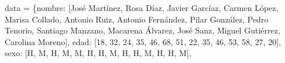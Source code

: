 \documentclass[
  letterpaper,
  DIV=11,
  numbers=noendperiod]{scrreprt}
\newenvironment{Shaded}{\begin{snugshade}}{\end{snugshade}}
\newcommand{\DecValTok}[1]{\textcolor[rgb]{0.68,0.00,0.00}{#1}}
\newcommand{\NormalTok}[1]{\textcolor[rgb]{0.00,0.23,0.31}{#1}}
\newcommand{\OperatorTok}[1]{\textcolor[rgb]{0.37,0.37,0.37}{#1}}
\newcommand{\StringTok}[1]{\textcolor[rgb]{0.13,0.47,0.30}{#1}}
\begin{document}
\begin{Shaded}
\begin{Highlighting}[]
\NormalTok{data }\OperatorTok{=}\NormalTok{ \{}\StringTok{\textquotesingle{}nombre\textquotesingle{}}\NormalTok{: [}\StringTok{\textquotesingle{}José Martínez\textquotesingle{}}\NormalTok{, }\StringTok{\textquotesingle{}Rosa Díaz\textquotesingle{}}\NormalTok{, }\StringTok{\textquotesingle{}Javier Garcíaz\textquotesingle{}}\NormalTok{, }\StringTok{\textquotesingle{}Carmen López\textquotesingle{}}\NormalTok{, }\StringTok{\textquotesingle{}Marisa Collado\textquotesingle{}}\NormalTok{, }\StringTok{\textquotesingle{}Antonio Ruiz\textquotesingle{}}\NormalTok{, }\StringTok{\textquotesingle{}Antonio Fernández\textquotesingle{}}\NormalTok{, }
                   \StringTok{\textquotesingle{}Pilar González\textquotesingle{}}\NormalTok{, }\StringTok{\textquotesingle{}Pedro Tenorio\textquotesingle{}}\NormalTok{, }\StringTok{\textquotesingle{}Santiago Manzano\textquotesingle{}}\NormalTok{, }\StringTok{\textquotesingle{}Macarena Álvarez\textquotesingle{}}\NormalTok{, }\StringTok{\textquotesingle{}José Sanz\textquotesingle{}}\NormalTok{, }\StringTok{\textquotesingle{}Miguel Gutiérrez\textquotesingle{}}\NormalTok{, }\StringTok{\textquotesingle{}Carolina Moreno\textquotesingle{}}\NormalTok{],}
        \StringTok{\textquotesingle{}edad\textquotesingle{}}\NormalTok{: [}\DecValTok{18}\NormalTok{, }\DecValTok{32}\NormalTok{, }\DecValTok{24}\NormalTok{, }\DecValTok{35}\NormalTok{, }\DecValTok{46}\NormalTok{, }\DecValTok{68}\NormalTok{, }\DecValTok{51}\NormalTok{, }\DecValTok{22}\NormalTok{, }\DecValTok{35}\NormalTok{, }\DecValTok{46}\NormalTok{, }\DecValTok{53}\NormalTok{, }\DecValTok{58}\NormalTok{, }\DecValTok{27}\NormalTok{, }\DecValTok{20}\NormalTok{],}
        \StringTok{\textquotesingle{}sexo\textquotesingle{}}\NormalTok{: [}\StringTok{\textquotesingle{}H\textquotesingle{}}\NormalTok{, }\StringTok{\textquotesingle{}M\textquotesingle{}}\NormalTok{, }\StringTok{\textquotesingle{}H\textquotesingle{}}\NormalTok{, }\StringTok{\textquotesingle{}M\textquotesingle{}}\NormalTok{, }\StringTok{\textquotesingle{}M\textquotesingle{}}\NormalTok{, }\StringTok{\textquotesingle{}H\textquotesingle{}}\NormalTok{, }\StringTok{\textquotesingle{}H\textquotesingle{}}\NormalTok{, }\StringTok{\textquotesingle{}M\textquotesingle{}}\NormalTok{, }\StringTok{\textquotesingle{}H\textquotesingle{}}\NormalTok{, }\StringTok{\textquotesingle{}H\textquotesingle{}}\NormalTok{, }\StringTok{\textquotesingle{}M\textquotesingle{}}\NormalTok{, }\StringTok{\textquotesingle{}H\textquotesingle{}}\NormalTok{, }\StringTok{\textquotesingle{}H\textquotesingle{}}\NormalTok{, }\StringTok{\textquotesingle{}M\textquotesingle{}}\NormalTok{],}

\end{Highlighting}
\end{Shaded}
\end{document}
